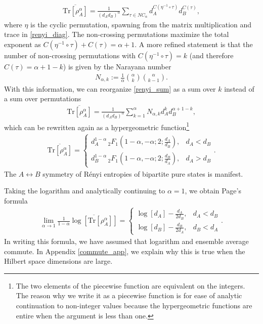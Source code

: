\documentclass[a4paper,11pt]{article}
\newcommand{\Tr}{\text{Tr}}
\newcommand*{\JKF}[1]{\textcolor{blue}{[JKF: #1]}}
\newcommand*{\SR}[1]{\textcolor{magenta}{[SR: \textsf{#1}]}}
\begin{document}
\begin{align}
    \overline{\Tr \left[\rho_{A}^{{\alpha}} \right]}= \frac{1}{(d_A d_B)^{\alpha}}\sum_{\tau \in NC_{\alpha}} d_A^{C(\eta^{-1} \circ \tau)} d_B^{C(\tau)},
    \label{renyi_sum}
\end{align}
where $\eta$ is the cyclic permutation, spawning from the matrix multiplication and trace in \eqref{renyi_diag}. 
The non-crossing permutations maximize the total exponent as $C(\eta^{-1} \circ \tau) +C(\tau)= {\alpha} + 1$. A more refined statement is that the number of non-crossing permutations with $C(\eta^{-1} \circ \tau) = k$ (and therefore $C( \tau) = \alpha + 1- k$) is given by the Narayana number
\begin{align}
    N_{{\alpha},k} := \frac{1}{\alpha}\binom{{\alpha}}{k}\binom{{\alpha}}{k-1}.
\end{align}
With this information, we can reorganize \eqref{renyi_sum} as a sum over $k$ instead of a sum over permutations
\begin{align}
    \overline{\Tr \left[\rho_{A}^{{\alpha}} \right]}= \frac{1}{(d_A d_B)^{\alpha}}\sum_{k= 1}^{\alpha} N_{{\alpha},k} d_A^{k} d_B^{{\alpha}+1-k},
    \label{renyi_sum_reorg}
\end{align}
which can be rewritten again as a hypergeometric function\footnote{The two elements of the piecewise function are equivalent on the integers. The reason why we write it as a piecewise function is for ease of analytic continuation to non-integer values because the hypergeometric functions are entire when the argument is less than one.}
\begin{align}
    \overline{\Tr \left[\rho_{A}^{{\alpha}} \right]}=\begin{cases}
        d_A^{1-{\alpha}} \, _2F_1\left(1-{\alpha},-{\alpha};2;\frac{d_A}{d_B}\right), &d_A < d_B
        \\
        d_B^{1-{\alpha}} \, _2F_1\left(1-{\alpha},-{\alpha};2;\frac{d_B}{d_A}\right), &d_A > d_B
    \end{cases} .
    \label{renyi_hyper}
\end{align}
The $A\leftrightarrow B$ symmetry of R\'enyi entropies of bipartite pure states is manifest.

Taking the logarithm and analytically continuing to $\alpha = 1$, we obtain Page's formula \cite{1993PhRvL..71.1291P}
\begin{align}
    \lim_{\alpha \rightarrow 1} \frac{1}{1 - \alpha} \overline{\log\left[\Tr \left[\rho_{A}^{{\alpha}} \right]\right]} = \begin{cases}
        \log \left[d_A\right] -\frac{d_A}{2d_B}, & d_A < d_B
        \\
        \log \left[d_B\right] -\frac{d_B }{2d_A}, & d_B < d_A
    \end{cases}.
\end{align}
In writing this formula, we have assumed that logarithm and ensemble average commute. In Appendix \ref{commute_app}, we explain why this is true when the Hilbert space dimensions are large. 
\end{document}

